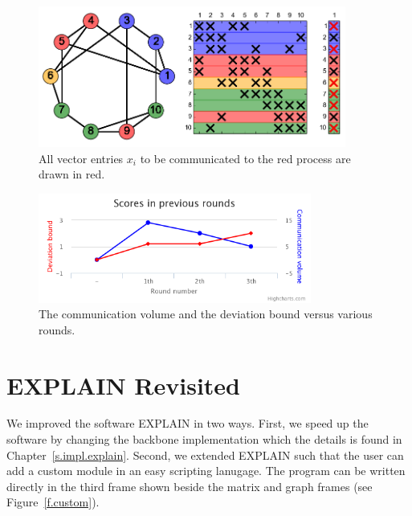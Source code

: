 \documentclass[12pt, oneside]{book}
\begin{document}
\begin{figure}
\centering
\includegraphics[width=0.9\textwidth]{redComm}
\caption{All vector entries $x_i$ to be communicated to the red process are drawn in red.}
\label{f.communication}
\end{figure}

\begin{figure}
\centering
\includegraphics[width=0.8\textwidth]{chart}
\caption{The communication volume and the deviation bound versus various rounds.}
\label{f.score}
\end{figure}

\section{EXPLAIN Revisited}
We improved the software EXPLAIN in two ways. 
First, we speed up the software by changing the backbone implementation
which the details is found in Chapter~\ref{s.impl.explain}.
Second, we extended EXPLAIN such that the user can add a custom module 
in an easy scripting lanugage. The program can be written directly 
in the third frame shown beside the matrix and graph frames
(see Figure~\ref{f.custom}).
\end{document}

